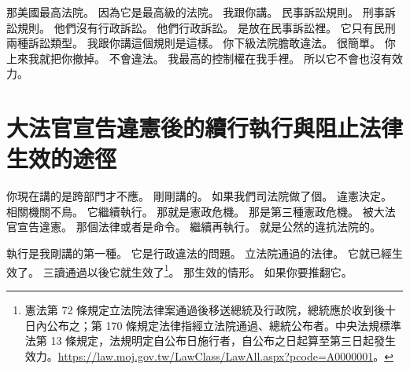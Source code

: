 \hypertarget{w01:cue:2215}{}那美國最高法院。
\hypertarget{w01:cue:2216}{}因為它是最高級的法院。
\hypertarget{w01:cue:2217}{}我跟你講。
\hypertarget{w01:cue:2218}{}民事訴訟規則。
\hypertarget{w01:cue:2219}{}刑事訴訟規則。
\hypertarget{w01:cue:2220}{}他們沒有行政訴訟。
\hypertarget{w01:cue:2221}{}他們行政訴訟。
\hypertarget{w01:cue:2222}{}是放在民事訴訟裡。
\hypertarget{w01:cue:2223}{}它只有民刑兩種訴訟類型。
\hypertarget{w01:cue:2224}{}我跟你講這個規則是這樣。
\hypertarget{w01:cue:2225}{}你下級法院膽敢違法。
\hypertarget{w01:cue:2226}{}很簡單。
\hypertarget{w01:cue:2227}{}你上來我就把你撤掉。
\hypertarget{w01:cue:2228}{}不會違法。
\hypertarget{w01:cue:2229}{}我最高的控制權在我手裡。
\hypertarget{w01:cue:2230}{}所以它不會也沒有效力。

\section{大法官宣告違憲後的續行執行與阻止法律生效的途徑}

\hypertarget{w01:cue:2231}{}你現在講的是跨部門才不應。
\hypertarget{w01:cue:2232}{}剛剛講的。
\hypertarget{w01:cue:2233}{}如果我們司法院做了個。
\hypertarget{w01:cue:2234}{}違憲決定。
\hypertarget{w01:cue:2235}{}相關機關不鳥。
\hypertarget{w01:cue:2236}{}它繼續執行。
\hypertarget{w01:cue:2237}{}那就是憲政危機。
\hypertarget{w01:cue:2238}{}那是第三種憲政危機。
\hypertarget{w01:cue:2239}{}被大法官宣告違憲。
\hypertarget{w01:cue:2240}{}那個法律或者是命令。
\hypertarget{w01:cue:2241}{}繼續再執行。
\hypertarget{w01:cue:2242}{}就是公然的違抗法院的。

\hypertarget{w01:cue:2243}{}執行是我剛講的第一種。
\hypertarget{w01:cue:2244}{}它是行政違法的問題。
\hypertarget{w01:cue:2245}{}立法院通過的法律。
\hypertarget{w01:cue:2246}{}它就已經生效了。
\hypertarget{w01:cue:2247}{}三讀通過以後它就生效了\footnote{憲法第 72 條規定立法院法律案通過後移送總統及行政院，總統應於收到後十日內公布之；第 170 條規定法律指經立法院通過、總統公布者。中央法規標準法第 13 條規定，法規明定自公布日施行者，自公布之日起算至第三日起發生效力。\url{https://law.moj.gov.tw/LawClass/LawAll.aspx?pcode=A0000001}。}。
\hypertarget{w01:cue:2248}{}那生效的情形。
\hypertarget{w01:cue:2249}{}如果你要推翻它。

